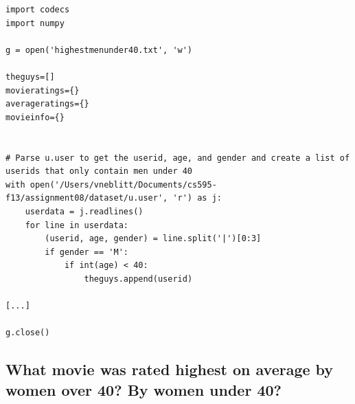 \documentclass{article}
\begin{document}
\begin{lstlisting}[frame=single, caption=highestmenunder40.py, label=highestmenunder40]
import codecs
import numpy

g = open('highestmenunder40.txt', 'w')

theguys=[]
movieratings={}
averageratings={}
movieinfo={}


# Parse u.user to get the userid, age, and gender and create a list of userids that only contain men under 40
with open('/Users/vneblitt/Documents/cs595-f13/assignment08/dataset/u.user', 'r') as j:
	userdata = j.readlines()
	for line in userdata:
		(userid, age, gender) = line.split('|')[0:3]
		if gender == 'M':
			if int(age) < 40:
				theguys.append(userid)

[...]

g.close()
\end{lstlisting}

\newpage
\subsection{What movie was rated highest on average by women over 40? By women under 40?}
\end{document}
